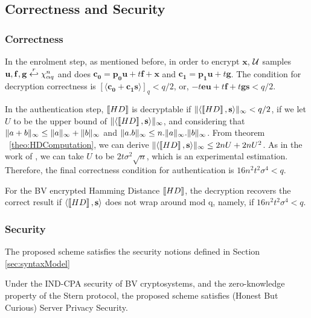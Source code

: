\subsection{Correctness and Security}
\label{sec:protocol1CorrectnessSecurity}

\subsubsection{Correctness}
\label{sec:correctness}
In the enrolment step, as mentioned before, in order to encrypt $\mathbf{x}$,
$\mathcal{U}$ samples $\mathbf{u,f,g} \stackrel{r}{\hookleftarrow} \chi_{\alpha q}^n$ and does
$\mathbf{c_0} = \mathbf{p_0u} + t\mathbf{f} + \mathbf{x}$ and
$\mathbf{c_1} = \mathbf{p_1u} + t\mathbf{g}$. The condition for decryption
correctness is $[\langle \mathbf{c_0 + c_1s} \rangle]_q < q/2$, or,
$-t\mathbf{eu} + t\mathbf{f} + t\mathbf{gs} < q/2$.

In the authentication step, \(\left\llbracket HD\right\rrbracket\) is decryptable if
\(\Vert \langle \left\llbracket HD\right\rrbracket, \mathbf{s} \rangle \Vert_{\infty} < q/2\), if we let \(U\) to be
the upper bound of \(\Vert \langle \left\llbracket HD\right\rrbracket, \mathbf{s} \rangle \Vert_{\infty}\), and
considering that \(\Vert a + b \Vert_{\infty} \leq \Vert a \Vert_{\infty} + \Vert b \Vert_{\infty}\) and
\(\Vert a.b \Vert_{\infty} \leq n.\Vert a \Vert_{\infty}.\Vert b \Vert_{\infty}\). From theorem
~\ref{theo:HDComputation}, we can derive
\(\Vert \langle \left\llbracket HD\right\rrbracket,\mathbf{s} \rangle \Vert_{\infty} \leq 2nU + 2nU^{2}\). As in the
work of \cite{naehrig2011can}, we can take \(U\) to be
\(2t \sigma^{2} \sqrt{n}\), which is an experimental estimation. Therefore, the
final correctness condition for authentication is
\( 16n^{2}t^{2}\sigma^{4} < q\).
\begin{lemma}
  \label{le:hdcorrectness}
 For the BV encrypted Hamming Distance \(\left\llbracket HD\right\rrbracket\), the decryption recovers the correct result if \(\langle \left\llbracket HD\right\rrbracket,
 \mathbf{s} \rangle\) does not wrap around mod q, namely, if \(16n^{2}t^{2}\sigma^{4} < q\).
\end{lemma}

\subsubsection{Security}
\label{sec:security}
The proposed scheme satisfies the security notions defined in Section \ref{sec:syntaxModel}
\begin{theorem}
  \label{theo:server}
  Under the IND-CPA security of BV cryptosystems, and the zero-knowledge property of the Stern protocol, the proposed
  scheme satisfies (Honest But Curious) Server Privacy Security.
\end{theorem}


